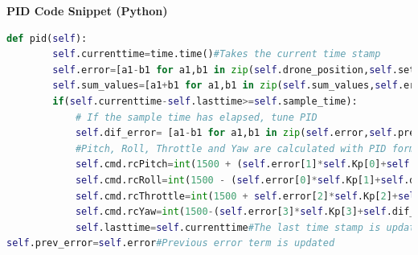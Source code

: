 \large{\textbf{PID Code Snippet (Python)}}
\begin{lstlisting}[language=Python]
def pid(self):
		self.currenttime=time.time()#Takes the current time stamp
		self.error=[a1-b1 for a1,b1 in zip(self.drone_position,self.setpoint)]#Calculates the error by subtracting drone position and set waypoint positions
		self.sum_values=[a1+b1 for a1,b1 in zip(self.sum_values,self.error)]#sum of previous error values are added together for the given sample time
		if(self.currenttime-self.lasttime>=self.sample_time):
			# If the sample time has elapsed, tune PID
			self.dif_error= [a1-b1 for a1,b1 in zip(self.error,self.prev_error)]#derivative term- difference between current and previous error
			#Pitch, Roll, Throttle and Yaw are calculated with PID formulas
			self.cmd.rcPitch=int(1500 + (self.error[1]*self.Kp[0]+self.dif_error[1]*self.Kd[0]/(self.sample_time)+self.sum_values[1]*self.Ki[0]*self.sample_time/self.iterations))
			self.cmd.rcRoll=int(1500 - (self.error[0]*self.Kp[1]+self.dif_error[0]*self.Kd[1]/(self.sample_time)+self.sum_values[0]*self.Ki[1]*self.sample_time/self.iterations))
			self.cmd.rcThrottle=int(1500 + self.error[2]*self.Kp[2]+self.dif_error[2]*self.Kd[2]/(self.sample_time)+self.sum_values[2]*self.Ki[2]*self.sample_time/self.iterations)
			self.cmd.rcYaw=int(1500-(self.error[3]*self.Kp[3]+self.dif_error[3]*self.Kd[3]/(self.sample_time)+self.sum_values[3]*self.Ki[3]*self.sample_time/self.iterations))
			self.lasttime=self.currenttime#The last time stamp is updated
self.prev_error=self.error#Previous error term is updated
\end{lstlisting}


